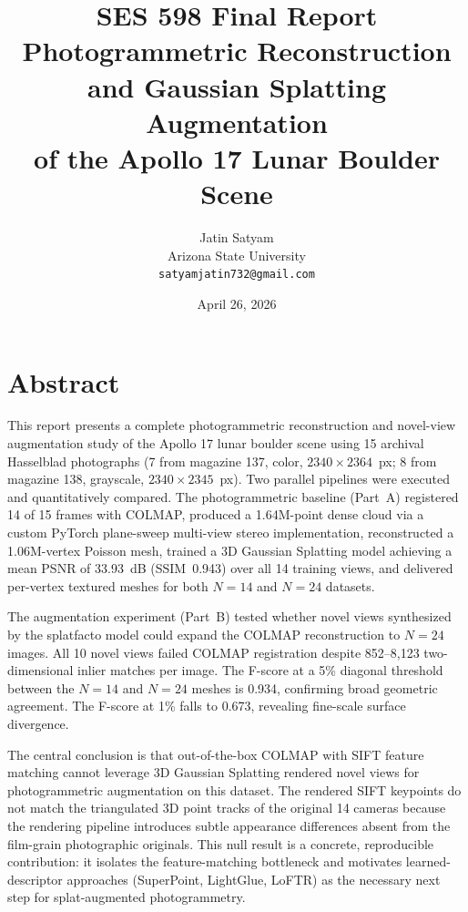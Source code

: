 \documentclass[12pt]{article}
\title{\textbf{SES 598 Final Report}\\
Photogrammetric Reconstruction and Gaussian Splatting Augmentation\\
of the Apollo 17 Lunar Boulder Scene}
\author{Jatin Satyam\\
Arizona State University\\
\texttt{satyamjatin732@gmail.com}}
\date{April 26, 2026}
\begin{document}
\maketitle
\tableofcontents
\clearpage

\section{Abstract}

This report presents a complete photogrammetric reconstruction and novel-view augmentation study of the Apollo 17 lunar boulder scene using 15 archival Hasselblad photographs (7 from magazine 137, color, $2340 \times 2364$~px; 8 from magazine 138, grayscale, $2340 \times 2345$~px). Two parallel pipelines were executed and quantitatively compared. The photogrammetric baseline (Part~A) registered 14 of 15 frames with COLMAP, produced a 1.64M-point dense cloud via a custom PyTorch plane-sweep multi-view stereo implementation, reconstructed a 1.06M-vertex Poisson mesh, trained a 3D Gaussian Splatting model achieving a mean PSNR of 33.93~dB (SSIM~0.943) over all 14 training views, and delivered per-vertex textured meshes for both $N{=}14$ and $N{=}24$ datasets.

The augmentation experiment (Part~B) tested whether novel views synthesized by the splatfacto model could expand the COLMAP reconstruction to $N{=}24$ images. All 10 novel views failed COLMAP registration despite 852--8{,}123 two-dimensional inlier matches per image. The F-score at a 5\% diagonal threshold between the $N{=}14$ and $N{=}24$ meshes is 0.934, confirming broad geometric agreement. The F-score at 1\% falls to 0.673, revealing fine-scale surface divergence.

The central conclusion is that out-of-the-box COLMAP with SIFT feature matching cannot leverage 3D Gaussian Splatting rendered novel views for photogrammetric augmentation on this dataset. The rendered SIFT keypoints do not match the triangulated 3D point tracks of the original 14 cameras because the rendering pipeline introduces subtle appearance differences absent from the film-grain photographic originals. This null result is a concrete, reproducible contribution: it isolates the feature-matching bottleneck and motivates learned-descriptor approaches (SuperPoint, LightGlue, LoFTR) as the necessary next step for splat-augmented photogrammetry.
\end{document}
